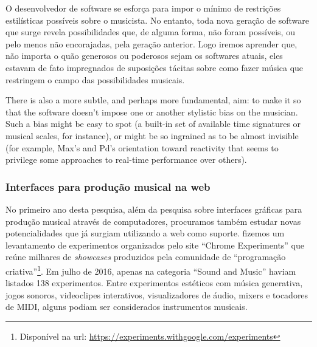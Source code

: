 \begin{citacao}
 O desenvolvedor de software se esforça para impor o mínimo de restrições estilísticas possíveis sobre o musicista. No entanto, toda nova geração de software que surge revela possibilidades que, de alguma forma, não foram possíveis, ou pelo menos não encorajadas, pela geração anterior. Logo iremos aprender que, não importa o quão generosos ou poderosos sejam os softwares atuais, eles estavam de fato impregnados de suposições tácitas sobre como fazer música que restringem o campo das possibilidades musicais.

\end{citacao}


\begin{citacao}
There is also a more subtle, and perhaps more fundamental, aim: to make it so that the software doesn’t impose one or another stylistic bias on the musician. Such a bias might be easy to spot (a built-in set of available time signatures or musical scales, for instance), or might be so ingrained as to be almost invisible (for example, Max’s and Pd’s orientation toward reactivity that seems to privilege some approaches to real-time performance over others).
\end{citacao}

\subsubsection{Interfaces para produção musical na web}
No primeiro ano desta pesquisa, além da pesquisa sobre interfaces gráficas para produção musical através de computadores, procuramos também estudar novas potencialidades que já surgiam utilizando a web como suporte.  fizemos um levantamento de experimentos organizados pelo site ``Chrome Experiments'' que reúne milhares de \emph{showcases} produzidos pela comunidade de ``programação criativa''\footnote{Disponível na url: \url{https://experiments.withgoogle.com/experiments}}. Em julho de 2016, apenas na categoria ``Sound and Music''  haviam listados 138 experimentos. Entre experimentos estéticos com música generativa, jogos sonoros, videoclipes interativos, visualizadores de áudio, mixers e tocadores de MIDI, alguns podiam ser considerados instrumentos musicais. 

